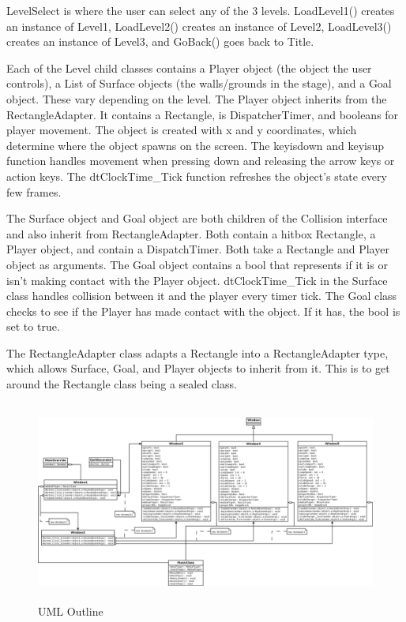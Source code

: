 \documentclass[10pt,conference,onecolumn,compsoc]{IEEEtran}
\begin{document}
LevelSelect is where the user can select any of the 3 levels. LoadLevel1() creates an instance of Level1, LoadLevel2() creates an instance of Level2, LoadLevel3() creates an instance of Level3, and GoBack() goes back to Title.

Each of the Level child classes contains a Player object (the object the user controls), a List of Surface objects (the walls/grounds in the stage), and a Goal object. These vary depending on the level.
The Player object inherits from the RectangleAdapter. It contains a Rectangle, is DispatcherTimer, and booleans for player movement. The object is created with x and y coordinates, which determine where the object spawns on the screen. The keyisdown and keyisup function handles movement when pressing down and releasing the arrow keys or action keys. The dtClockTime\_Tick function refreshes the object's state every few frames.

The Surface object and Goal object are both children of the Collision interface and also inherit from RectangleAdapter. Both contain a hitbox Rectangle, a Player object, and contain a DispatchTimer. Both take a Rectangle and Player object as arguments. The Goal object contains a bool that represents if it is or isn't making contact with the Player object. dtClockTime\_Tick in the Surface class handles collision between it and the player every timer tick. The Goal class checks to see if the Player has made contact with the object. If it has, the bool is set to true.

The RectangleAdapter class adapts a Rectangle into a RectangleAdapter type, which allows Surface, Goal, and Player objects to inherit from it. This is to get around the Rectangle class being a sealed class.
\begin{figure}[ht!]
\includegraphics[height=250px, width=500px]{elyzium_uml.png}
\caption{UML Outline}
\label{Facade}
\end{figure}
\end{document}
